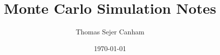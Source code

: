 \documentclass{article}
\title{Monte Carlo Simulation Notes}
\author{Thomas Sejer Canham}
\date{\today}
\theoremstyle{definition}
\theoremstyle{remark}
\begin{document}

\begin{titlepage}

    \maketitle
    \thispagestyle{empty}
    \tableofcontents

\end{titlepage}




\end{document}
